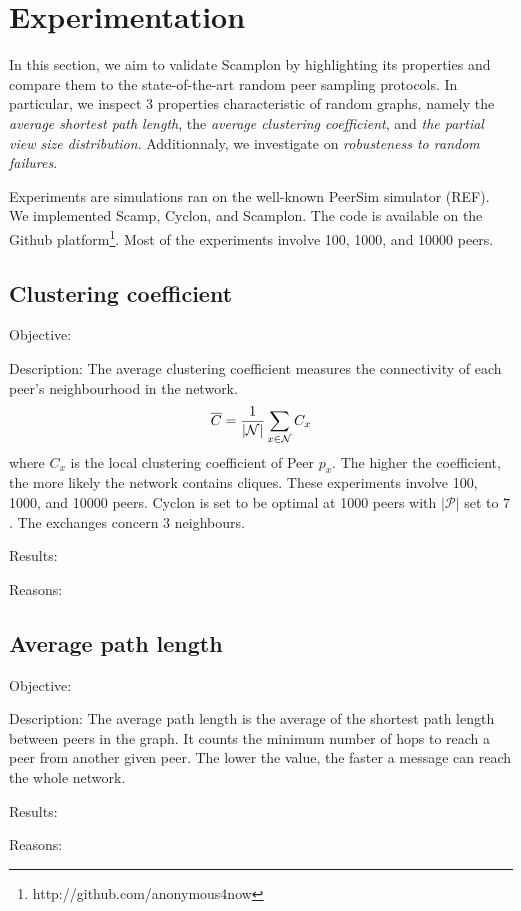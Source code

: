 
\section{Experimentation}
\label{sec:experiments}
In this section, we aim to validate Scamplon by highlighting its properties and
compare them to the state-of-the-art random peer sampling protocols. In
particular, we inspect 3 properties characteristic of random graphs, namely the
\emph{average shortest path length}, the \emph{average clustering coefficient},
and \emph{the partial view size distribution}. Additionnaly, we investigate on
\emph{robusteness to random failures}.

Experiments are simulations ran on the well-known PeerSim simulator (REF). We
implemented Scamp, Cyclon, and Scamplon. The code is available on the Github
platform\footnote{http://github.com/anonymous4now}. Most of the experiments
involve 100, 1000, and 10000 peers.

\subsection{Clustering coefficient}
\begin{asparadesc}
\item[Objective:]
\item[Description:] The average clustering coefficient measures the
  connectivity of each peer's neighbourhood in the network.
  \begin{equation}
    \overline{C} = {1\over |\mathcal{N}|}\sum\limits_{x\in\mathcal{N}}C_x
    \end{equation}
    where $C_x$ is the local clustering coefficient of Peer $p_x$. The higher
    the coefficient, the more likely the network contains cliques. These
    experiments involve 100, 1000, and 10000 peers. Cyclon is set to be optimal
    at 1000 peers with $|\mathcal{P}|$ set to $7$. The exchanges concern $3$
    neighbours.
\item[Results:]
\item[Reasons:]
\end{asparadesc}

\subsection{Average path length}
\begin{asparadesc}
\item[Objective:]
\item[Description:] The average path length is the average of the shortest path
  length between peers in the graph. It counts the minimum number of hops to
  reach a peer from another given peer. The lower the value, the faster a
  message can reach the whole network.
\item[Results:]
\item[Reasons:]
\end{asparadesc}


